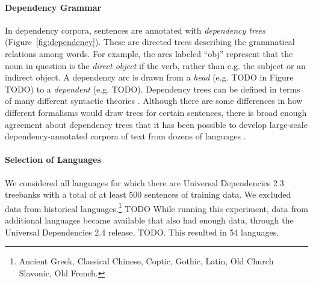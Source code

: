 \paragraph{Dependency Grammar}
In dependency corpora, sentences are annotated with \emph{dependency trees} (Figure~\ref{fig:dependency}).
These are directed trees describing the grammatical relations among words. For example, the arcs labeled ``obj'' represent that the noun in question is the \emph{direct object} if the verb, rather than e.g. the subject or an indirect object.
A dependency arc is drawn from a \emph{head} (e.g. TODO in Figure TODO) to a \emph{dependent} (e.g. TODO).
Dependency trees can be defined in terms of many different syntactic theories \citep{corbett1993heads}.
Although there are some differences in how different formalisms would draw trees for certain sentences, there is broad enough agreement about dependency trees that it has been possible to develop large-scale dependency-annotated corpora of text from dozens of languages \cite{nivre2017universal}.

\paragraph{Selection of Languages}
We considered all languages for which there are Universal Dependencies 2.3 treebanks with a total of at least 500 sentences of training data.
We excluded data from historical languages.\footnote{Ancient Greek, Classical Chinese, Coptic, Gothic, Latin, Old Church Slavonic, Old French.}
TODO While running this experiment, data from additional languages became available that also had enough data, through the Universal Dependencies 2.4 release. TODO.
This resulted in 54 languages.

